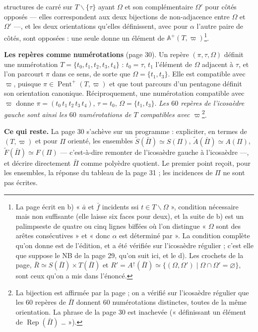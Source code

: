 \documentclass[11pt,a4paper]{article}
\begin{document}
structures de carré sur $T \smallsetminus \{\tau\}$ ayant $\Omega$ et son
complémentaire $\Omega'$ pour côtés opposés --- elles correspondent aux deux
bijections de non-adjacence entre $\Omega$ et $\Omega'$ ---, et les deux
orientations qu'elles définissent, avec pour $\alpha$ l'autre paire de côtés,
sont opposées : une seule donne un élément de $\mathbb{A}^{+}(T,
\varpi)$\footnote{La page écrit en b) « $\bar a$ et $\bar f$ incidents ssi
$t \in T \smallsetminus \Omega$ », condition nécessaire mais non suffisante
(elle laisse six faces pour deux), et la suite de b) est un palimpseste de
quatre ou cinq lignes biffées où l'on distingue « $\Omega$ sont des arêtes
consécutives » et « donc $\alpha$ est déterminé par ». La condition complète
qu'on donne est de l'édition, et a été vérifiée sur l'icosaèdre régulier ;
c'est elle que suppose le NB de la page 29, qu'on suit ici, et le d). Les
crochets de la page, $\bar R \simeq S(\bar\Pi) \times T(\bar\Pi)$ et $R' =
A^{\uparrow}(\bar\Pi) \simeq \{(\Omega, \Omega') \mid \Omega \cap \Omega' =
\varnothing\}$, sont ceux qu'on a mis dans l'énoncé.}.

\textbf{Les repères comme numérotations} (page 30). Un repère $(\pi, \tau,
\Omega)$ définit une numérotation $T = \{t_0, t_1, t_2, t_3, t_4\}$ : $t_0 =
\tau$, $t_1$ l'élément de $\Omega$ adjacent à $\tau$, et l'on parcourt $\pi$
dans ce sens, de sorte que $\Omega = \{t_1, t_3\}$. Elle est compatible avec
$\varpi$, puisque $\pi \in \operatorname{Pent}^{+}(T, \varpi)$ et que tout
parcours d'un pentagone définit son orientation canonique. Réciproquement, une
numérotation compatible avec $\varpi$ donne $\pi = (t_0\,t_1\,t_2\,t_3\,t_4)$,
$\tau = t_0$, $\Omega = \{t_1, t_3\}$. \emph{Les $60$ repères de l'icosaèdre
gauche sont ainsi les $60$ numérotations de $T$ compatibles avec
$\varpi$}\footnote{La bijection est affirmée par la page ; on a vérifié sur
l'icosaèdre régulier que les $60$ repères de $\bar\Pi$ donnent $60$
numérotations distinctes, toutes de la même orientation. La phrase de la page
30 est inachevée (« définissant un élément de $\operatorname{Rep}(\bar\Pi)$
… »).}.

\textbf{Ce qui reste.} La page 30 s'achève sur un programme : expliciter, en
termes de $(T, \varpi)$ et pour $\Pi$ orienté, les ensembles
$\tilde S(\bar\Pi) \simeq S(\Pi)$, $\tilde A(\bar\Pi) \simeq A(\Pi)$,
$\tilde F(\bar\Pi) \simeq F(\Pi)$ --- c'est-à-dire remonter de l'icosaèdre
gauche à l'icosaèdre ---, et décrire directement $\bar\Pi$ comme polyèdre
quotient. Le premier point reçoit, pour les ensembles, la réponse du tableau
de la page 31 ; les incidences de $\Pi$ ne sont pas écrites.
\end{document}
